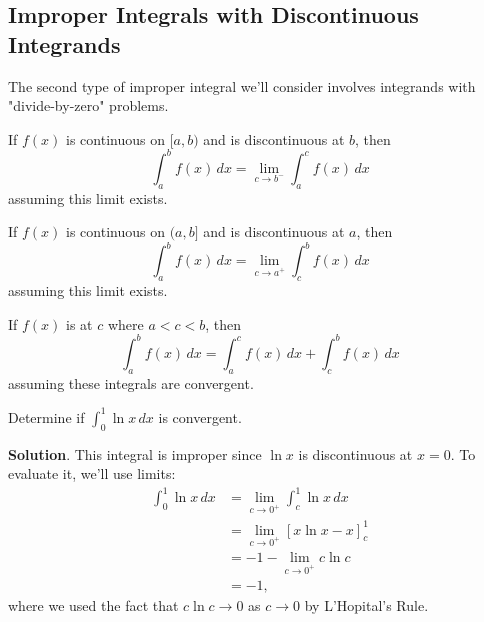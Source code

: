 \documentclass[10pt,]{book}
\theoremstyle{ptxplainnotitle}
\theoremstyle{ptxplaintitle}
\theoremstyle{ptxplainnotitle}
\theoremstyle{ptxplaintitle}
\theoremstyle{ptxplainnotitle}
\theoremstyle{ptxplaintitle}
\theoremstyle{ptxdefinitionnotitle}
\theoremstyle{ptxdefinitiontitle}
\theoremstyle{ptxdefinitionnotitle}
\theoremstyle{ptxdefinitiontitle}
\theoremstyle{ptxdefinitionnotitle}
\theoremstyle{ptxdefinitiontitle}
\theoremstyle{ptxdefinitionnotitle}
\theoremstyle{ptxdefinitiontitle}
\theoremstyle{ptxdefinitionnotitle}
\theoremstyle{ptxdefinitiontitle}
\numberwithin{equation}{section}
\newcommand{\lt}{<}
\begin{document}
\subsection[{Improper Integrals with Discontinuous Integrands}]{Improper Integrals with Discontinuous Integrands}\label{subsection-improper-integrals-with-discontinuous-integrands}
\hypertarget{p-594}{}%
The second type of improper integral we'll consider involves integrands with "divide-by-zero" problems.%
\begin{definition}\label{definition-type-2-improper-integral}
\hypertarget{p-595}{}%
If \(f(x)\) is continuous on \([a,b)\) and is discontinuous at \(b\), then%
\begin{equation*}
\int_{a}^{b}f(x)\,dx = \lim_{c\to b^{-}}\int_{a}^{c}f(x)\,dx
\end{equation*}
assuming this limit exists.%
\par
\hypertarget{p-596}{}%
If \(f(x)\) is continuous on \((a,b]\) and is discontinuous at \(a\), then%
\begin{equation*}
\int_{a}^{b}f(x)\,dx = \lim_{c\to a^{+}}\int_{c}^{b}f(x)\,dx
\end{equation*}
assuming this limit exists.%
\par
\hypertarget{p-597}{}%
If \(f(x)\) is at \(c\) where \(a \lt c\lt b\), then%
\begin{equation*}
\int_{a}^{b}f(x)\,dx = \int_{a}^{c}f(x)\,dx + \int_{c}^{b}f(x)\,dx
\end{equation*}
assuming these integrals are convergent.%
\end{definition}
\begin{example}\label{example-logarithmic-discontinuity}
\hypertarget{p-598}{}%
Determine if \(\int_{0}^{1}\ln x\,dx\) is convergent.%
\par\smallskip%
\noindent\textbf{Solution}.\hypertarget{solution-129}{}\quad%
\hypertarget{p-599}{}%
This integral is improper since \(\ln x\) is discontinuous at \(x = 0\). To evaluate it, we'll use limits:%
\begin{align*}
\int_{0}^{1}\ln x\,dx & = \lim_{c\to0^{+}}\int_{c}^{1}\ln x\,dx \\
& = \lim_{c\to0^{+}}\left[x\ln x - x\right]_{c}^{1} \\
& = -1 - \lim_{c\to0^{+}}c\ln c \\
& = -1, 
\end{align*}
where we used the fact that \(c\ln c\to 0\) as \(c\to0\) by L'Hopital's Rule.%
\end{example}
\end{document}
